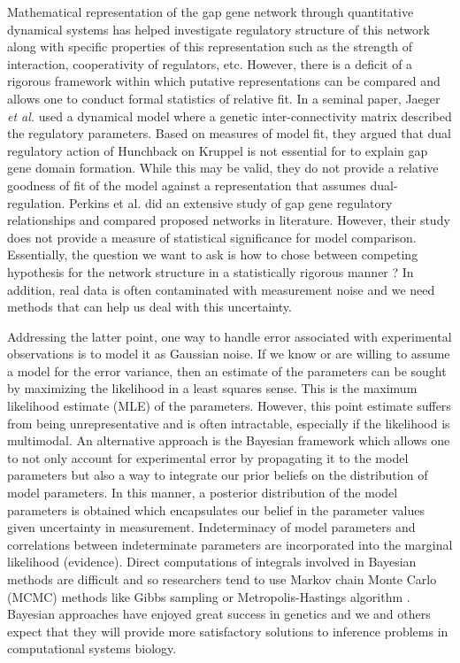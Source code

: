 Mathematical representation of the gap gene network through quantitative dynamical systems has helped investigate regulatory structure of this network along with specific properties of this representation such as the strength of interaction, cooperativity of regulators, etc. However, there is a deficit of a rigorous framework within which putative representations can be compared and allows one to conduct formal statistics of relative fit. In a seminal paper, Jaeger \textit{et al.} \cite{jaeger04b} used a dynamical model where a genetic inter-connectivity matrix described the regulatory parameters. Based on measures of model fit, they argued that dual regulatory action of Hunchback on Kruppel is not essential for to explain gap gene domain formation. While this may be valid, they do not provide a relative goodness of fit of the model against a representation that assumes dual-regulation. Perkins et al. \cite{jaeger06b} did an extensive study of gap gene regulatory relationships and compared proposed networks in literature. However, their study does not provide a measure of statistical significance for model comparison. Essentially, the question we want to ask is how to chose between competing hypothesis for the network structure in a statistically rigorous manner ? In addition, real data is often contaminated with measurement noise and we need methods that can help us deal with this uncertainty. 

Addressing the latter point, one way to handle error associated with experimental observations is to model it as Gaussian noise. If we know or are willing to assume a model for the error variance, then an estimate of the parameters can be sought by maximizing the likelihood in a least squares sense. This is the maximum likelihood estimate (MLE) \cite{stigler07} of the parameters. However, this point estimate suffers from being unrepresentative and is often intractable, especially if the likelihood is multimodal. 
An alternative approach is the Bayesian framework which allows one to not only account for experimental error by propagating it to the model parameters but also a way to integrate our prior beliefs on the distribution of model parameters. In this manner, a posterior distribution of the model parameters is obtained which encapsulates our belief in the parameter values given uncertainty in measurement. Indeterminacy of model parameters and correlations between indeterminate parameters are incorporated into the marginal likelihood (evidence). Direct computations of integrals involved in Bayesian methods are difficult and so researchers tend to use Markov chain Monte Carlo (MCMC) methods like Gibbs sampling or Metropolis-Hastings algorithm \cite{hastings70}. Bayesian approaches have enjoyed great success in genetics \cite{beaumont04} and we and others \cite{wilkinson07} expect that they will provide more satisfactory solutions to inference problems in computational systems biology.

